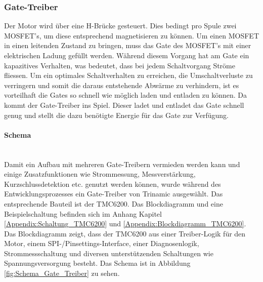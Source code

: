 \subsubsection{Gate-Treiber}
\label{subsubsec:Gate-Treiber}


Der Motor wird über eine H-Brücke gesteuert. Dies bedingt pro Spule zwei MOSFET's, um diese entsprechend magnetisieren zu können. Um einen MOSFET in einen leitenden Zustand zu bringen, muss das Gate des MOSFET's mit einer elektrischen Ladung gefüllt werden. Während diesem Vorgang hat am Gate ein kapazitives Verhalten, was bedeutet, dass bei jedem Schaltvorgang Ströme fliessen. Um ein optimales Schaltverhalten zu erreichen, die Umschaltverluste zu verringern und somit die daraus entstehende Abwärme zu verhindern, ist es vorteilhaft die Gates so schnell wie möglich laden und entladen zu können. Da kommt der Gate-Treiber ins Spiel. Dieser ladet und entladet das Gate schnell genug und stellt die dazu benötigte Energie für das Gate zur Verfügung.

\paragraph{Schema}\mbox{}\\

Damit ein Aufbau mit mehreren Gate-Treibern vermieden werden kann und einige Zusatzfunktionen wie Strommessung, Messverstärkung, Kurzschlussdetektion etc. genutzt werden können, wurde während des Entwicklungsprozesses ein Gate-Treiber von Trinamic ausgewählt. Das entsprechende Bauteil ist der TMC6200. Das Blockdiagramm und eine Beispielschaltung befinden sich im Anhang Kapitel \ref{Appendix:Schaltung_TMC6200} und \ref{Appendix:Blockdiagramm_TMC6200}. Das Blockdiagramm zeigt, dass der TMC6200 aus einer Treiber-Logik für den Motor, einem SPI-/Pinsettings-Interface, einer Diagnosenlogik, Strommessschaltung und diversen unterstützenden Schaltungen wie Spannungsversorgung besteht. Das Schema ist in Abbildung \ref{fig:Schema_Gate_Treiber} zu sehen.


